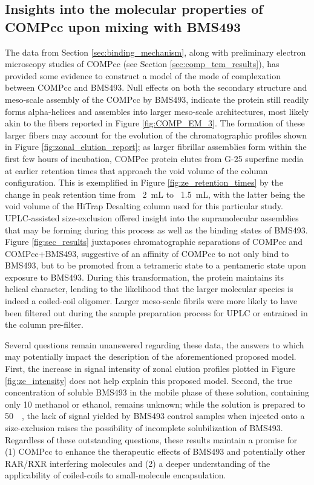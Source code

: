 \begin{refsection}
\subsection{Insights into the molecular properties of COMPcc upon mixing with
BMS493}
\label{sec:discuss_binding}
The data from Section \ref{sec:binding_mechanism}, along with preliminary
electron microscopy studies of COMPcc (see Section \ref{sec:comp_tem_results}),
has provided some evidence to construct a model of the mode of complexation
between COMPcc and BMS493. Null effects on both the secondary structure and
meso-scale assembly of the COMPcc by BMS493, indicate the protein still
readily forms alpha-helices and assembles into larger meso-scale
architectures, most likely akin to the fibers reported in Figure
\ref{fig:COMP_EM_3}. The formation of these larger fibers may account for the
evolution of the chromatographic profiles shown in Figure
\ref{fig:zonal_elution_report}; as larger fibrillar assemblies form within the
first few hours of incubation, COMPcc protein elutes from G-25 superfine media at
earlier retention times that approach the void volume of the column
configuration. This is exemplified in Figure \ref{fig:ze_retention_times} by the
change in peak retention time from ~\SI{2}{\mL} to ~\SI{1.5}{\mL}, with the latter
being the void volume of the HiTrap Desalting column used for this particular
study. UPLC-assisted size-exclusion offered insight into the supramolecular
assemblies that may be forming during this process as well as the binding states
of BMS493. Figure \ref{fig:sec_results} juxtaposes chromatographic separations of
COMPcc and COMPcc+BMS493, suggestive of an affinity of COMPcc to not only bind to
BMS493, but to be promoted from a tetrameric state to a pentameric state upon
exposure to BMS493. During this transformation, the protein maintains its
helical character, lending to the likelihood that the larger molecular species
is indeed a coiled-coil oligomer. Larger meso-scale fibrils were more likely to
have been filtered out during the sample preparation process for UPLC or
entrained in the column pre-filter.

Several questions remain unanswered regarding these data, the answers to which
may potentially impact the description of the aforementioned proposed model.
First, the increase in signal intensity of zonal elution profiles plotted in
Figure \ref{fig:ze_intensity} does not help explain this proposed model. Second,
the true concentration of soluble BMS493 in the mobile phase of these solution,
containing only \SI{10}{\volper} methanol or ethanol, remains unknown; while the
solution is prepared to \SI{50}{\micro\moLar}, the lack of signal yielded by
BMS493 control samples when injected onto a size-exclusion raises the
possibility of incomplete solubilization of BMS493. Regardless of these
outstanding questions, these results maintain a promise for (1) COMPcc to enhance
the therapeutic effects of BMS493 and potentially other RAR/RXR interfering
molecules and (2) a deeper understanding of the applicability of coiled-coils to
small-molecule encapsulation.


\end{refsection}
